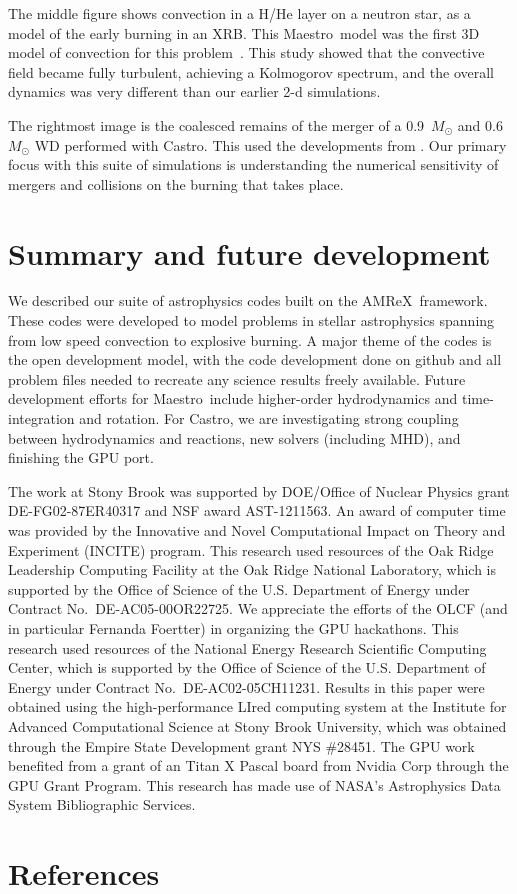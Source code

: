 \documentclass[letterpaper]{jpconf}
\newcommand{\maestro}{{\sffamily Maestro}}
\newcommand{\castro}{{\sffamily Castro}}
\newcommand{\amrex}{{\sffamily AMReX}}
\begin{document}
The middle figure shows convection in a H/He layer on a neutron star,
as a model of the early burning in an XRB.  This \maestro\ model was
the first 3D model of convection for this problem~\cite{xrb3}.  This
study showed that the convective field became fully turbulent,
achieving a Kolmogorov spectrum, and the overall dynamics was very
different than our earlier 2-d simulations.

The rightmost image is the coalesced remains of the merger of a
0.9~$M_\odot$ and 0.6~$M_\odot$ WD performed with \castro.  This used
the developments from \cite{wdmergerI}.  Our primary focus with this
suite of simulations is understanding the numerical sensitivity of
mergers and collisions on the burning that takes place.


\section{Summary and future development}

We described our suite of astrophysics codes built on the
\amrex\ framework.  These codes were developed to model problems in
stellar astrophysics spanning from low speed convection to explosive
burning.  A major theme of the codes is the open development model,
with the code development done on github and all problem files needed
to recreate any science results freely available.  Future development
efforts for \maestro\ include higher-order hydrodynamics and
time-integration and rotation.  For \castro, we are investigating
strong coupling between hydrodynamics and reactions, new solvers
(including MHD), and finishing the GPU port.



\ack The work at Stony Brook was supported by DOE/Office of Nuclear
Physics grant DE-FG02-87ER40317 and NSF award AST-1211563.  An award
of computer time was provided by the Innovative and Novel
Computational Impact on Theory and Experiment (INCITE) program.  This
research used resources of the Oak Ridge Leadership Computing Facility
at the Oak Ridge National Laboratory, which is supported by the Office
of Science of the U.S. Department of Energy under Contract
No.\ DE-AC05-00OR22725.  We appreciate the efforts of the OLCF (and in
particular Fernanda Foertter) in organizing the GPU hackathons.  This
research used resources of the National Energy Research Scientific
Computing Center, which is supported by the Office of Science of the
U.S. Department of Energy under Contract No.\ DE-AC02-05CH11231.
Results in this paper were obtained using the high-performance LIred
computing system at the Institute for Advanced Computational Science
at Stony Brook University, which was obtained through the Empire State
Development grant NYS \#28451.  The GPU work benefited from a grant of
an Titan X Pascal board from Nvidia Corp through the GPU Grant
Program.  This research has made use of NASA's Astrophysics Data
System Bibliographic Services.

\section*{References}



\end{document}
